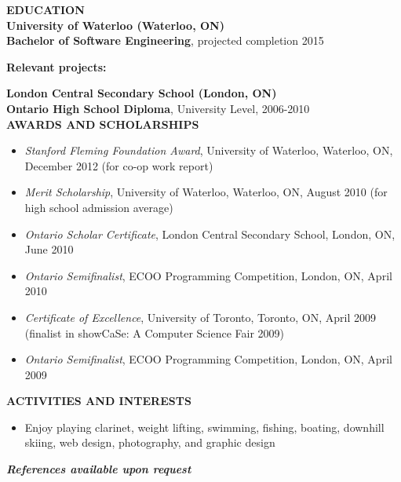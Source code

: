 \documentclass[10pt,letterpaper]{article}
\newcommand{\education}[4]
{
    \textbf{#1 (#2)}\\
    \textbf{#3}, #4
}
\begin{document}
\vspace{1em}
\textbf{EDUCATION} \hrulefill \\[0.5em]
\education{University of Waterloo}{Waterloo, ON}{Bachelor of Software Engineering}{projected completion 2015}\\
    \begin{adjustwidth}{0.1in}{0.5in}
	\textbf{Relevant projects:} 
    \end{adjustwidth}
\vspace{1em}
\education{London Central Secondary School}{London, ON}{Ontario High School Diploma}{University Level, 2006-2010}\\[1em]
\textbf{AWARDS AND SCHOLARSHIPS} \hrulefill \\
\begin{adjustwidth}{0.1in}{0.5in}
    \begin{itemize}
	\item \emph{Stanford Fleming Foundation Award}, University of Waterloo, Waterloo, ON, December 2012 
	    (for co-op work report)
	\item \emph{Merit Scholarship}, University of Waterloo, Waterloo, ON, August 2010 
	    (for high school admission average)
	\item \emph{Ontario Scholar Certificate}, London Central Secondary School, London, ON, June 2010
	\item \emph{Ontario Semifinalist}, ECOO Programming Competition, London, ON, April 2010
	\item \emph{Certificate of Excellence}, University of Toronto, Toronto, ON, April 2009 
	    (finalist in showCaSe: A Computer Science Fair 2009)
	\item \emph{Ontario Semifinalist}, ECOO Programming Competition, London, ON, April 2009
    \end{itemize}
\end{adjustwidth}
\vspace{1em}
\textbf{ACTIVITIES AND INTERESTS} \hrulefill \\
\begin{adjustwidth}{0.1in}{0.5in}
    \begin{itemize}
	\item Enjoy playing clarinet, weight lifting, swimming, fishing, boating, downhill skiing, 
	    web design, photography, and graphic design
    \end{itemize}
\end{adjustwidth}
\begin{center}
	\textbf{\textit{References available upon request}}
\end{center}
\end{document}
